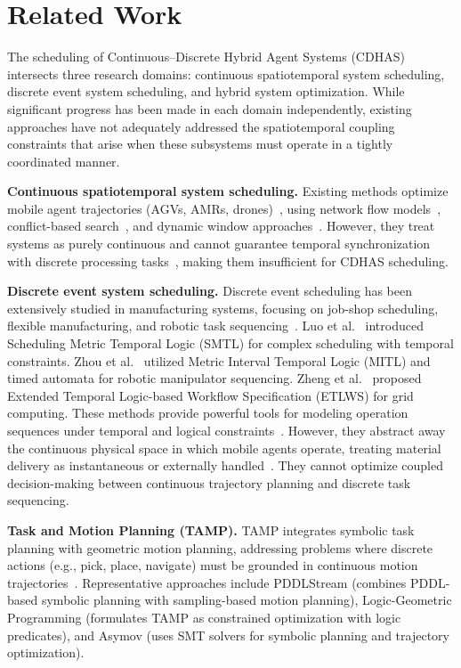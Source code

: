 \documentclass[manuscript,screen,review]{acmart}
\begin{document}
\section{Related Work}
\label{sec:Chapter_II}

The scheduling of Continuous--Discrete Hybrid Agent Systems (CDHAS) intersects 
three research domains: continuous spatiotemporal system scheduling, discrete 
event system scheduling, and hybrid system optimization. While significant 
progress has been made in each domain independently, existing approaches have 
not adequately addressed the spatiotemporal coupling constraints that arise 
when these subsystems must operate in a tightly coordinated manner.

\textbf{Continuous spatiotemporal system scheduling.} Existing methods optimize 
mobile agent trajectories (AGVs, AMRs, drones)~\cite{lian2022spatio, malings2018value}, using network flow models~\cite{chen2020yard}, 
conflict-based search~\cite{cao2025conflict}, and dynamic window approaches~\cite{liu2019route}. However, they treat systems as purely 
continuous and cannot guarantee temporal synchronization with discrete 
processing tasks~\cite{lei2025cooperative, zheng2024continuous}, making them insufficient for CDHAS scheduling.

\textbf{Discrete event system scheduling.} Discrete event scheduling has been 
extensively studied in manufacturing systems, focusing on job-shop scheduling, 
flexible manufacturing, and robotic task sequencing~\cite{wang2024smart, 
wang2016discrete}. Luo et al.\ \cite{luo2016using} introduced Scheduling 
Metric Temporal Logic (SMTL) for complex scheduling with temporal constraints. 
Zhou et al.\ \cite{zhou2016timed} utilized Metric Interval Temporal Logic 
(MITL) and timed automata for robotic manipulator sequencing. Zheng et al.\ 
\cite{zheng2007temporal} proposed Extended Temporal Logic-based Workflow 
Specification (ETLWS) for grid computing. These methods provide powerful 
tools for modeling operation sequences under temporal and logical constraints~\cite{zhang2024generation}. 
However, they abstract away the continuous physical space in which mobile 
agents operate, treating material delivery as instantaneous or externally 
handled~\cite{pooch2024discrete}. They cannot optimize coupled decision-making 
between continuous trajectory planning and discrete task sequencing.

\textbf{Task and Motion Planning (TAMP).} TAMP integrates symbolic task 
planning with geometric motion planning, addressing problems where discrete 
actions (e.g., pick, place, navigate) must be grounded in continuous motion 
trajectories~\cite{zhao2024survey}. 
Representative approaches include PDDLStream (combines PDDL-based symbolic 
planning with sampling-based motion planning), Logic-Geometric Programming 
(formulates TAMP as constrained optimization with logic predicates), and 
Asymov (uses SMT solvers for symbolic planning and trajectory optimization).
\end{document}
